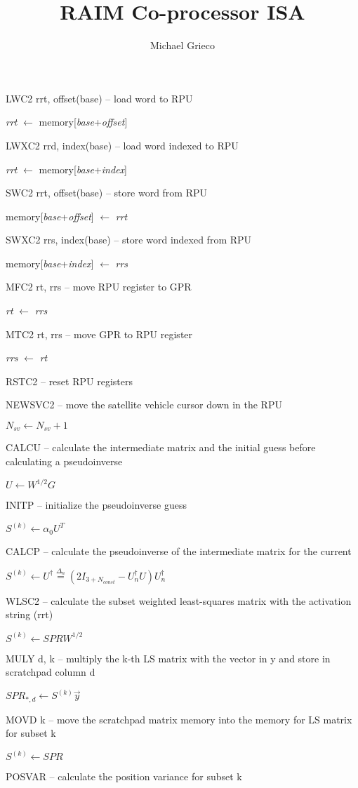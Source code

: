 \documentclass[11pt]{article}
\title{RAIM Co-processor ISA}
\author{Michael Grieco}
\date{}
\begin{document}
LWC2 rrt, offset(base) – load word to RPU

\emph{rrt} $\leftarrow$ memory[\emph{base}+\emph{offset}]

LWXC2 rrd, index(base) – load word indexed to RPU

\emph{rrt} $\leftarrow$ memory[\emph{base}+\emph{index}]

SWC2 rrt, offset(base) – store word from RPU

memory[\emph{base}+\emph{offset}] $\leftarrow$ \emph{rrt}

SWXC2 rrs, index(base) – store word indexed from RPU

memory[\emph{base}+\emph{index}] $\leftarrow$ \emph{rrs}

MFC2 rt, rrs – move RPU register to GPR

\emph{rt} $\leftarrow$ \emph{rrs}

MTC2 rt, rrs – move GPR to RPU register

\emph{rrs} $\leftarrow$ \emph{rt}

RSTC2 – reset RPU registers

NEWSVC2 – move the satellite vehicle cursor down in the RPU

$N_{sv} \leftarrow N_{sv} + 1$

CALCU – calculate the intermediate matrix and the initial guess before calculating a pseudoinverse

$U \leftarrow W^{1/2} G$

INITP – initialize the pseudoinverse guess

$S^{(k)} \leftarrow \alpha_0 U^{T}$

CALCP – calculate the pseudoinverse of the intermediate matrix for the current

$S^{(k)} \leftarrow U^{\dagger} \stackrel{\Delta_n}{=} (2I_{3+N_{const}} - U^{\dagger}_n U) U^{\dagger}_n
$

WLSC2 – calculate the subset weighted least-squares matrix with the activation string (rrt)

$S^{(k)} \leftarrow SPR W^{1/2}$

MULY d, k – multiply the k-th LS matrix with the vector in y and store in scratchpad column d

$SPR_{*,d} \leftarrow S^{(k)} \vec{y}$

MOVD k – move the scratchpad matrix memory into the memory for LS matrix for subset k

$S^{(k)} \leftarrow SPR$

POSVAR – calculate the position variance for subset k
\end{document}
